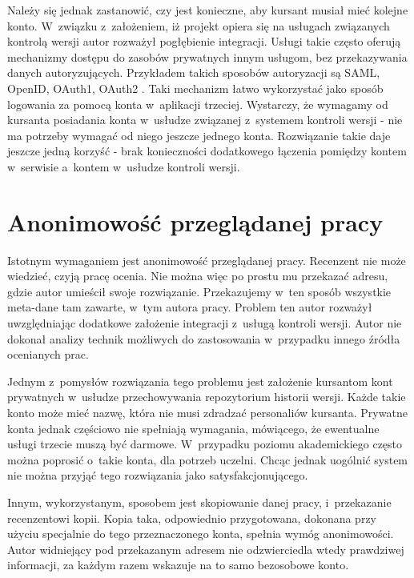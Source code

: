 \medskip
Należy się jednak zastanowić, czy jest konieczne, aby kursant musiał mieć kolejne konto. W~związku z~założeniem, iż projekt opiera się na usługach związanych kontrolą wersji autor rozważył pogłębienie integracji. Usługi takie często oferują mechanizmy dostępu do zasobów prywatnych innym usługom, bez przekazywania danych autoryzujących. Przykładem takich sposobów autoryzacji są SAML, OpenID, OAuth1, OAuth2 \cite{3rdAuth}. Taki mechanizm łatwo wykorzystać jako sposób logowania za pomocą konta w~aplikacji trzeciej. Wystarczy, że wymagamy od kursanta posiadania konta w~usłudze związanej z~systemem kontroli wersji - nie ma potrzeby wymagać od niego jeszcze jednego konta. Rozwiązanie takie daje jeszcze jedną korzyść - brak konieczności dodatkowego łączenia pomiędzy kontem w~serwisie a~kontem w~usłudze kontroli wersji. 

\section{Anonimowość przeglądanej pracy}
Istotnym wymaganiem jest anonimowość przeglądanej pracy. Recenzent nie może wiedzieć, czyją pracę ocenia. Nie można więc po prostu mu przekazać adresu, gdzie autor umieścił swoje rozwiązanie. Przekazujemy w~ten sposób wszystkie meta-dane tam zawarte, w~tym autora pracy. Problem ten autor rozważył uwzględniając dodatkowe założenie integracji z~usługą kontroli wersji. Autor nie dokonał analizy technik możliwych do zastosowania w~przypadku innego źródła ocenianych prac.

\medskip
Jednym z~pomysłów rozwiązania tego problemu jest założenie kursantom kont prywatnych w~usłudze przechowywania repozytorium historii wersji. Każde takie konto może mieć nazwę, która nie musi zdradzać personaliów kursanta. Prywatne konta jednak częściowo nie spełniają wymagania, mówiącego, że ewentualne usługi trzecie muszą być darmowe. W~przypadku poziomu akademickiego często można poprosić o~takie konta, dla potrzeb uczelni. Chcąc jednak uogólnić system nie można przyjąć tego rozwiązania jako satysfakcjonującego.

\medskip
Innym, wykorzystanym, sposobem jest skopiowanie danej pracy, i~przekazanie recenzentowi kopii. Kopia taka, odpowiednio przygotowana, dokonana przy użyciu specjalnie do tego przeznaczonego konta, spełnia wymóg anonimowości. Autor widniejący pod przekazanym adresem nie odzwierciedla wtedy prawdziwej informacji, za każdym razem wskazuje na to samo bezosobowe konto.


